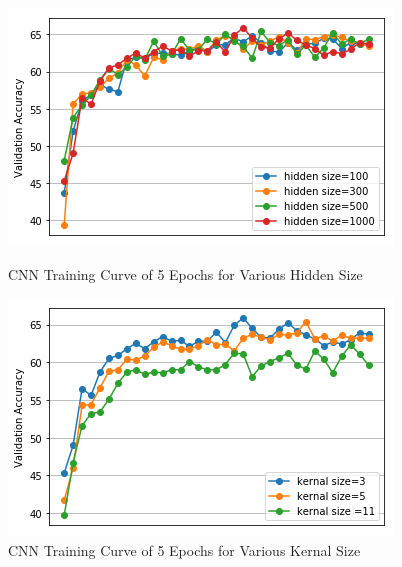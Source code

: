 \documentclass[10pt]{article}
\begin{document}
\begin{figure}[h]
\centering
\begin{minipage}{.4\textwidth}
  \includegraphics[width=\textwidth]{plot3}
  \caption{CNN Training Curve of 5 Epochs for Various Hidden Size}
\end{minipage}%
\hfill
\begin{minipage}{.4\textwidth}
  \includegraphics[width=\textwidth]{plot4}
  \caption{CNN Training Curve of 5 Epochs for Various Kernal Size}
\end{minipage}
\end{figure}
\end{document}
